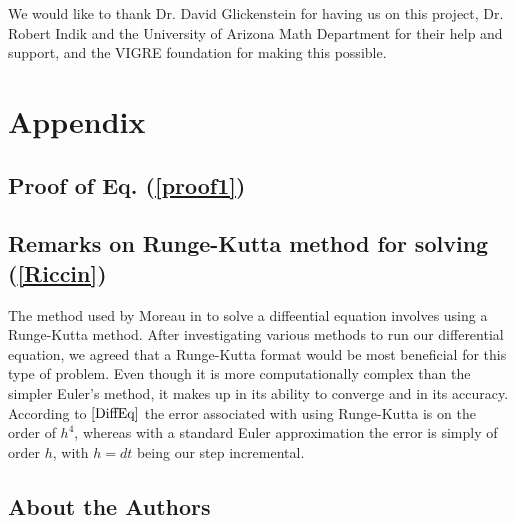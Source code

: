 \documentclass[12pt]{article}
\begin{document}
  \noindent We would like to thank Dr. David Glickenstein for having us on this project, Dr. Robert Indik and the University of Arizona Math Department for their help and support, and the VIGRE foundation for making this possible. 
  \maketitle
   
  \newpage
    
  
  
  \newpage
  \section*{Appendix}
  \maketitle
  
  \subsection*{Proof of Eq. (\ref{proof1})}
	\maketitle
  
  \subsection*{Remarks on Runge-Kutta method for solving (\ref{Riccin})}
	\maketitle

The method used by Moreau in \cite{JPM} to solve a diffeential equation involves using a Runge-Kutta method. After investigating various methods to run our differential equation, we agreed that a Runge-Kutta format would be most beneficial for this type of problem. Even though it is more computationally complex than the simpler Euler's method, it makes up in its ability to converge and in its accuracy. According to $\cite{DiffEq}$ the error associated with using Runge-Kutta is on the order of $h^4$, whereas with a standard Euler approximation the error is simply of order $h$, with $h = dt$ being our step incremental. \newline
  
  \newpage
  \subsection*{About the Authors}
  \maketitle
  
\end{document}

